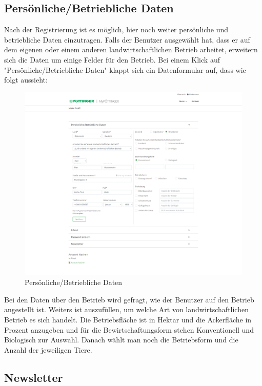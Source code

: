 \subsection{Persönliche/Betriebliche Daten}

Nach der Registrierung ist es möglich, hier noch weiter persönliche und betriebliche Daten einzutragen. Falls der Benutzer ausgewählt hat, dass er auf dem eigenen oder einem anderen landwirtschaftlichen Betrieb arbeitet, erweitern sich die Daten um einige Felder für den Betrieb. Bei einem Klick auf "Persönliche/Betriebliche Daten" klappt sich ein Datenformular auf, dass wie folgt aussieht:

\begin{figure}[H]
	\centerline{
		\includegraphics[width=1\textwidth]{./grafiken/erm_profil_daten.png}
	}
	\vskip0pt
	\caption{Persönliche/Betriebliche Daten} \label{fig:profilData}
\end{figure}

Bei den Daten über den Betrieb wird gefragt, wie der Benutzer auf den Betrieb angestellt ist. Weiters ist auszufüllen, um welche Art von landwirtschaftlichen Betrieb es sich handelt. Die Betriebsfläche ist in Hektar und die Ackerfläche in Prozent anzugeben und für die Bewirtschaftungsform stehen Konventionell und Biologisch zur Auswahl. Danach wählt man noch die Betriebsform und die Anzahl der jeweiligen Tiere.

\subsection{Newsletter}

